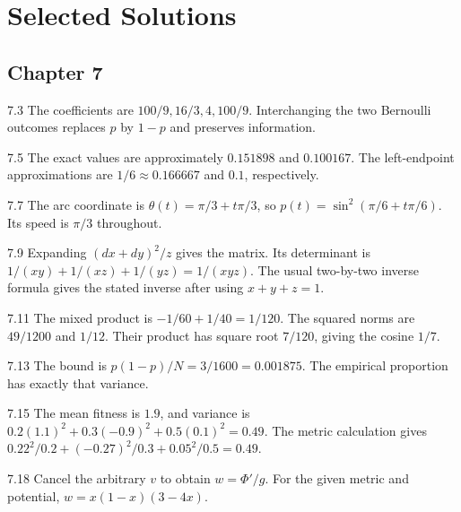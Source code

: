 \documentclass[11pt,oneside,openany]{book}
\theoremstyle{definition}
\theoremstyle{remark}
\newenvironment{answers}{\begin{description}[leftmargin=2.9em,labelwidth=2.5em,labelsep=.4em,itemsep=8pt,font=\normalfont\bfseries]}{\end{description}}
\numberwithin{equation}{chapter}
\begin{document}
\clearpage\backmatter
\chapter*{Selected Solutions}
\section*{Chapter 7}
\begin{answers}
\item[7.3] The coefficients are $100/9,16/3,4,100/9$. Interchanging the two Bernoulli outcomes replaces $p$ by $1-p$ and preserves information.
\item[7.5] The exact values are approximately $0.151898$ and $0.100167$. The left-endpoint approximations are $1/6\approx0.166667$ and $0.1$, respectively.
\item[7.7] The arc coordinate is $\theta(t)=\pi/3+t\pi/3$, so $p(t)=\sin^2(\pi/6+t\pi/6)$. Its speed is $\pi/3$ throughout.
\item[7.9] Expanding $(dx+dy)^2/z$ gives the matrix. Its determinant is $1/(xy)+1/(xz)+1/(yz)=1/(xyz)$. The usual two-by-two inverse formula gives the stated inverse after using $x+y+z=1$.
\item[7.11] The mixed product is $-1/60+1/40=1/120$. The squared norms are $49/1200$ and $1/12$. Their product has square root $7/120$, giving the cosine $1/7$.
\item[7.13] The bound is $p(1-p)/N=3/1600=0.001875$. The empirical proportion has exactly that variance.
\item[7.15] The mean fitness is $1.9$, and variance is $0.2(1.1)^2+0.3(-0.9)^2+0.5(0.1)^2=0.49$. The metric calculation gives $0.22^2/0.2+(-0.27)^2/0.3+0.05^2/0.5=0.49$.
\item[7.18] Cancel the arbitrary $v$ to obtain $w=\Phi'/g$. For the given metric and potential, $w=x(1-x)(3-4x)$.
\end{answers}
\end{document}
